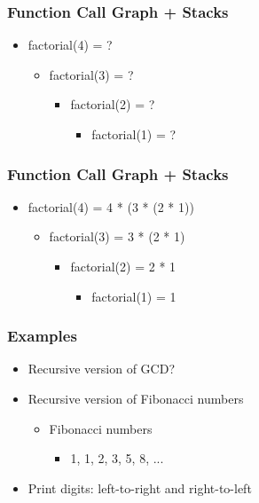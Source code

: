 \documentclass{../c-lecture}
\begin{document}
\begin{frame}
  \frametitle{Function Call Graph + Stacks}
  \begin{itemize}
    \item factorial(4) = ?
    \begin{itemize}
      \item factorial(3) = ?
      \begin{itemize}
        \item factorial(2) = ?
        \begin{itemize}
          \item factorial(1) = ?
        \end{itemize}
      \end{itemize}
    \end{itemize}
  \end{itemize}
\end{frame}

\begin{frame}
  \frametitle{Function Call Graph + Stacks}
  \begin{itemize}
    \item factorial(4) = 4 * (3 * (2 * 1))
    \begin{itemize}
      \item factorial(3) = 3 * (2 * 1)
      \begin{itemize}
        \item factorial(2) = 2 * 1
        \begin{itemize}
          \item factorial(1) = 1
        \end{itemize}
      \end{itemize}
    \end{itemize}
  \end{itemize}
\end{frame}

\begin{frame}
  \frametitle{Examples}
  \begin{itemize}
    \item Recursive version of GCD?
    \item Recursive version of Fibonacci numbers
    \begin{itemize}
      \item Fibonacci numbers
      \begin{itemize}
        \item 1, 1, 2, 3, 5, 8, ...
      \end{itemize}
    \end{itemize}
    \item Print digits: left-to-right and right-to-left
  \end{itemize}
\end{frame}
\end{document}

